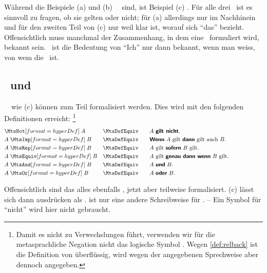 Während die Beispiele (a) und (b) \atomare\ \Aussagen\ sind, ist Beispiel (c) \zerlegbar.
Für alle drei \Aussagen\ ist es sinnvoll zu fragen, ob sie gelten oder nicht;
für (a) allerdings nur im Nachhinein und für den zweiten Teil von (c) nur weil klar ist, worauf sich "`das"' bezieht.
Offensichtlich muss manchmal der Zusammenhang, in dem eine \Aussage\ formuliert wird, bekannt sein.
\textZB\ ist die Bedeutung von "`Ich"' nur dann bekannt, wenn man weiss, von wem die \Aussage\ ist.

\subsection[Aussagen und Metaoperationen]{\Aussagen\ und \Metaoperationen}%
\label  {sub:AussagenUndMetaoperationen}

\Zerlegbare\ \Aussagen\ wie (c) können zum Teil formalisiert werden.
Dies wird mit den folgenden Definitionen erreicht:%
\footnote{%
	Damit es nicht zu Verwechslungen führt, verwenden wir für die metasprachliche Negation nicht das logische Symbol \chrqt{\OjkNot}.
	Wegen \eqref{def:relback}  ist die Definition von \chrqt{\MtsRep} überflüssig, wird wegen der angegebenen Sprechweise aber dennoch angegeben.
}
\begin{align}
	&    \defSymUna{\MtsNot}   A & \MtsDefEquiv \qquad &
	\text{$A$ \defFt{gilt nicht}.}
	\\
	& A \defSymBin{\MtsImp}   B & \MtsDefEquiv \qquad &
	\text{\defFt{Wenn} $A$ gilt \defFt{dann} gilt auch $B$.}
	\\
	& A \defSymBin{\MtsRep}   B & \MtsDefEquiv \qquad &
	\text{$A$ gilt \defFt{sofern} $B$ gilt.}
	\\
	& A \defSymBin{\MtsEquiv} B & \MtsDefEquiv \qquad &
	\text{$A$ gilt \defFt{genau dann wenn} $B$ gilt.}
	\\
	& A \defSymBin{\MtsAnd}   B & \MtsDefEquiv \qquad &
	\text{$A$ \defFt{und}  $B$.}
	\\
	& A \defSymBin{\MtsOr}    B & \MtsDefEquiv \qquad &
	\text{$A$ \defFt{oder} $B$.}
	\formulatoleft
\end{align}

Offensichtlich sind das alles ebenfalls \Aussagen, jetzt aber teilweise formalisiert.
(c) lässt sich dann ausdrücken als .
 ist nur eine andere Schreibweise für .
-- Ein Symbol für "`nicht"' wird hier nicht gebraucht.

